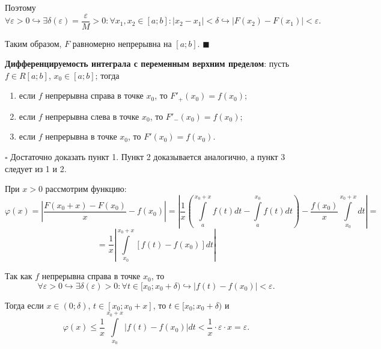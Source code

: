 \documentclass[12pt, a4paper, reqno]{article}
\begin{document}
    Поэтому
    \begin{equation*}
        \forall \varepsilon > 0 \hookrightarrow \exists \delta(\varepsilon) = \frac{\varepsilon}{M} > 0:
        \forall x_1, x_2 \in [a; b]: |x_2 - x_1| < \delta \hookrightarrow |F(x_2) - F(x_1)| < \varepsilon.
    \end{equation*}

    Таким образом, $F$ равномерно непрерывна на $[a; b]$.
    $\blacksquare$

    \textbf{Дифференцируемость интеграла с переменным верхним пределом}: пусть $f \in R[a; b]$,
    $x_0 \in [a; b]$; тогда
    \begin{enumerate}
        \item если $f$ непрерывна справа в точке $x_0$, то $F'_{+}(x_0) = f(x_0)$;
        \item если $f$ непрерывна слева в точке $x_0$, то $F'_{-}(x_0) = f(x_0)$;
        \item если $f$ непрерывна в точке $x_0$, то $F'(x_0) = f(x_0)$.
    \end{enumerate}

    $\square$
    Достаточно доказать пункт 1. Пункт 2 доказывается аналогично, а пункт 3 следует из 1 и 2.

    При $x > 0$ рассмотрим функцию:
    \begin{equation*}
        \varphi(x) = \left|\frac{F(x_0 + x) - F(x_0)}{x} - f(x_0)\right| =
        \left|
            \frac{1}{x}\left(\int\limits_{a}^{x_0 + x} f(t)dt - \int\limits_{a}^{x_0} f(t)dt\right)-
            \frac{f(x_0)}{x}\int\limits_{x_0}^{x_0 + x} dt
        \right| =
    \end{equation*}
    \begin{equation*}
        = \frac{1}{x}\left|\int\limits_{x_0}^{x_0 + x} [f(t) - f(x_0)]dt\right|
    \end{equation*}

    Так как $f$ непрерывна справа в точке $x_0$, то
    \begin{equation*}
        \forall \varepsilon > 0 \hookrightarrow \exists \delta(\varepsilon) > 0:
        \forall t \in [x_0; x_0 + \delta) \hookrightarrow |f(t) - f(x_0)| < \varepsilon.
    \end{equation*}

    Тогда если $x \in (0; \delta)$, $t \in [x_0; x_0 + x]$, то $t \in [x_0; x_0 + \delta)$ и
    \begin{equation*}
        \varphi(x) \leq \frac{1}{x}\int\limits_{x_0}^{x_0 + x} |f(t) - f(x_0)|dt <
        \frac{1}{x} \cdot \varepsilon \cdot x = \varepsilon.
    \end{equation*}
\end{document}
